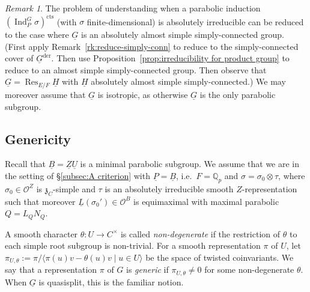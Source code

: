 \documentclass[a4paper]{amsart}
\numberwithin{equation}{section}
\theoremstyle{remark}
\newtheorem{remark}[thm]{Remark}
\theoremstyle{definition}
\DeclareMathOperator{\Ind}{Ind}
\DeclareMathOperator{\Res}{Res}
\newcommand{\Q}{\mathbb{Q}}
\newcommand{\alggrp}[1]{\underline{#1}}
\newcommand{\der}{\mathrm{der}}
\newcommand{\cts}{\mathrm{cts}}
\begin{document}
\begin{remark}\label{rk:reduce-abs-simple-simply-conn}
  The problem of understanding when a parabolic induction $(\Ind_{P}^{G}\sigma)^{\cts}$ (with $\sigma$ finite-dimensional) is absolutely irreducible can be reduced to the case where $\alggrp G$ is an absolutely almost simple simply-connected group.
  (First apply Remark~\ref{rk:reduce-simply-conn} to reduce to the simply-connected cover of $\alggrp G^\der$.
  Then use Proposition~\ref{prop:irreducibility for product group} to reduce to an almost simple simply-connected group.
  Then observe that $\alggrp G = \Res_{E/F} \alggrp H$ with $\alggrp H$ absolutely almost simple simply-connected.)
  We may moreover assume that $\alggrp G$ is isotropic, as otherwise $\alggrp G$ is the only parabolic subgroup.
\end{remark}


\subsection{Genericity}
\label{sec:generic}
Recall that $\alggrp{B} = \alggrp{Z}\alggrp{U}$ is a minimal parabolic subgroup.
We assume that we are in the setting of \S\ref{subsec:A criterion} with $\alggrp P = \alggrp B$, i.e.\ $F = \Q_p$ and $\sigma = \sigma_0 \otimes \tau$, where $\sigma_0 \in \mathcal{O}^{Z}$ is $\mathfrak{z}_{C}$-simple and $\tau$ is an absolutely irreducible smooth $Z$-representation such that moreover $\underline{L}(\sigma_0') \in \mathcal{O}^{B}$ is equimaximal with maximal parabolic $Q = L_{Q}N_{Q}$.

A smooth character $\theta\colon U\to C^{\times}$ is called \emph{non-degenerate} if the restriction of $\theta$ to each simple root subgroup is non-trivial.
For a smooth representation $\pi$ of $U$, let $\pi_{U,\theta} := \pi/\langle \pi(u)v - \theta(u)v\mid u\in U\rangle$ be the space of twisted coinvariants.
We say that a representation $\pi$ of $G$ is \emph{generic} if $\pi_{U,\theta}\ne 0$ for some non-degenerate $\theta$.
When $\alggrp{G}$ is quasisplit, this is the familiar notion.
\end{document}
